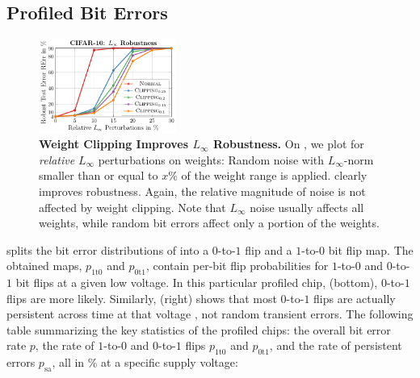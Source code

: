 \subsection{Profiled Bit Errors}
\label{subsec:supp-errors-profiled}

\begin{figure}[t]
	\centering
	\includegraphics[width=0.4\textwidth]{c10_clipping_linf.pdf}
	\vspace*{-8px}
	\caption{\textbf{Weight Clipping Improves $L_\infty$ Robustness.} On \CifarT, we plot \RTE for \emph{relative} $L_\infty$ perturbations on weights: Random noise with $L_\infty$-norm smaller than or equal to $x\%$ of the weight range is applied. \Clipping clearly improves robustness. Again, the relative magnitude of noise is not affected by weight clipping. Note that $L_\infty$ noise usually affects all weights, while random bit errors affect only a portion of the weights.}
	\label{fig:supp-clipping-inf}
	\vspace*{-0.2cm}
\end{figure}

 splits the bit error distributions of  into a $0$-to-$1$ flip and a $1$-to-$0$ bit flip map. The obtained maps, $p_{\text{1t0}}$ and $p_{\text{0t1}}$, contain per-bit flip probabilities for $1$-to-$0$ and $0$-to-$1$ bit flips at a given low voltage. In this particular profiled chip,  (bottom), $0$-to-$1$ flips are more likely. Similarly,  (right) shows that most  $0$-to-$1$ flips are actually persistent across time at that voltage \ie, not random transient errors. 
The following table summarizing the key statistics of the profiled chips: the overall bit error rate $p$, the rate of $1$-to-$0$ and $0$-to-$1$ flips $p_{\text{1t0}}$ and $p_{\text{0t1}}$, and the rate of persistent errors $p_{\text{sa}}$, all in \% at a specific supply voltage:

